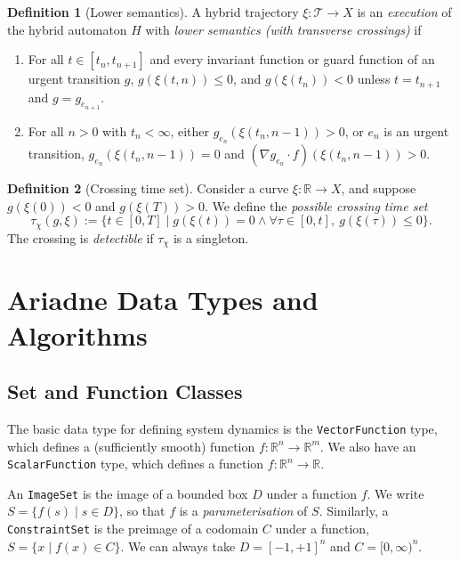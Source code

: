\documentclass[english,a4paper]{article}
\newcommand{\R}{\mathbb{R}}
\theoremstyle{theorem}
\theoremstyle{definition}
\newtheorem*{definition*}{Definition}
\theoremstyle{remark}
\begin{document}
\begin{definition*}[Lower semantics]
A hybrid trajectory $\xi:\mathcal{T}\rightarrow X$ is an \emph{execution} of the hybrid automaton $H$ with \emph{lower semantics (with transverse crossings)} if
\begin{enumerate}\addtocounter{enumi}{2}
\item For all $t\in[t_n,t_{n+1}]$ and every invariant function or guard function of an urgent transition $g$, $g(\xi(t,n)) \leq 0$, and $g(\xi(t_n))<0$ unless $t=t_{n+1}$ and $g=g_{e_{n+1}}$.
\item For all $n>0$ with $t_n<\infty$, either $g_{e_n}(\xi(t_n,n\!-\!1))>0$, or $e_n$ is an urgent transition, $g_{e_n}(\xi(t_n,n\!-\!1))=0$ and $(\nabla g_{e_n}\cdot f)(\xi(t_n,n\!-\!1))>0$.
\end{enumerate}
\end{definition*}

\begin{definition*}[Crossing time set]
Consider a curve $\xi:\R\rightarrow X$, and suppose $g(\xi(0))<0$ and $g(\xi(T))>0$. We define the \emph{possible crossing time set} $$\tau_\chi(g,\xi) := \{ t\in [0,T] \mid g(\xi(t))=0 \wedge \forall \tau\in[0,t],\ g(\xi(\tau))\leq 0\}.$$
The crossing is \emph{detectible} if $\tau_\chi$ is a singleton.
\end{definition*}




\section{Ariadne Data Types and Algorithms}

\subsection{Set and Function Classes}

The basic data type for defining system dynamics is the \texttt{VectorFunction} type, which defines a (sufficiently smooth) function $f:\R^n\rightarrow\R^m$. We also have an \texttt{ScalarFunction} type, which defines a function $f:\R^n\rightarrow \R$.

An \texttt{ImageSet} is the image of a bounded box $D$ under a function $f$. We write $S=\{ f(s) \mid s\in D\}$, so that $f$ is a \emph{parameterisation} of $S$. Similarly, a \texttt{ConstraintSet} is the preimage of a codomain $C$ under a function, $S=\{ x \mid f(x)\in C \}$. We can always take $D=[-1,+1]^n$ and $C=[0,\infty)^n$.
\end{document}
